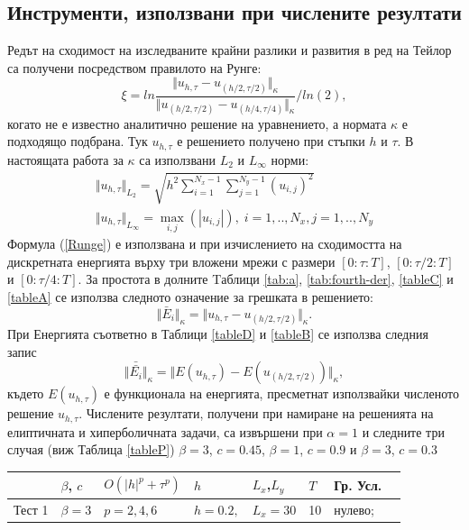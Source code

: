 \documentclass[a4paper]{article}
\newcommand{\rf}[1]{(\ref{#1})}
\theoremstyle{remark}
\begin{document}
\begin{large}
\subsection{Инструменти, използвани при числените резултати}\label{Instruments}

Редът на сходимост на изследваните крайни разлики и развития в ред на Тейлор са получени посредством правилото на Рунге:
\begin{equation}\label{Runge}
\xi = ln  \frac{\Vert u_{h,\tau} - u_{(h/2,\tau/2)} \Vert_\kappa } {\Vert  u_{(h/2,\tau/2)} - u_{(h/4,\tau/4)} \Vert_\kappa  } / ln(2),
\end{equation}
когато не е известно аналитично решение на уравнението, а нормата $\kappa$ е подходящо подбрана. Тук $u_{h,\tau}$ е решението получено при стъпки $h$ и $\tau$. В настоящата работа за $\kappa$ са използвани $L_2$ и $L_\infty$ норми:
\begin{align*}
\Vert u_{h,\tau} \Vert_{L_2} = \sqrt{ h^2 \sum_{i=1}^{N_x-1} \sum_{j=1}^{N_y-1}  (u_{i,j})^2 } \\
\Vert u_{h,\tau} \Vert_{L_\infty} = \max_{i,j}(|u_{i,j}|), \; i=1,..,N_x, j=1,..,N_y
\end{align*}
Формула \rf{Runge} е използвана и при изчислението на сходимостта на дискретната енергията върху три вложени мрежи с размери $[0:\tau:T]$, $[0:\tau/2:T]$ и $[0:\tau/4:T]$. За простота в долните Tаблици \ref{tab:a}, \ref{tab:fourth-der}, \ref{tableC} и \ref{tableA} се използва следното означение за грешката в решението:
$$\Vert \bar E_i \Vert_\kappa =  \Vert u_{h,\tau} - u_{(h/2,\tau/2)} \Vert_\kappa.$$ 
При Енергията съответно в Таблици \ref{tableD} и \ref{tableB} се използва следния запис
$$\Vert \bar{\bar{ E_i}} \Vert_\kappa=  \Vert E(u_{h,\tau}) - E(u_{(h/2,\tau/2)}) \Vert_\kappa,$$ 
където $E(u_{h,\tau})$ е функционала на енергията, пресметнат използвайки численото решение $u_{h,\tau}$.
Числените резултати, получени при намиране на решенията на елиптичната и хиперболичната задачи, са извършени при $\alpha = 1$ и следните три случая (виж Таблица \ref{tableP}) $\beta = 3$, $c=0.45$, $\beta = 1$, $c=0.9$ и $\beta = 3$, $c=0.3$
\begin{table}
\centering
\small
		\begin{tabular}{||c|l|l|l|l|l|l|l||}
			\hline
			\hline
          &    $\beta$, $c$ 	 & $O(|h|^p+\tau^p)$   &      $h$       	& $L_x$,$L_y$   	&  $T$    	& Гр. Усл.  \\
   			\hline 
			\hline
Тест 1  &      $\beta = 3$   &      $p=2, 4, 6$    	&    $h=0.2,$       	& $L_x = 30$     	&    10    	&    нулево;  \\

\end{tabular}
\end{table}
\end{large}
\end{document}
